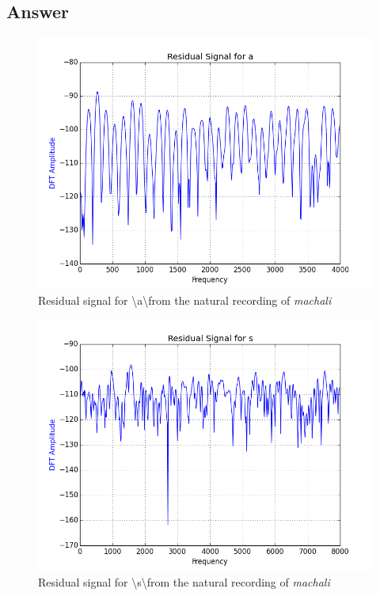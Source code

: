 \documentclass[a4paper]{article}
\begin{document}
\subsection{Answer}


\textbf{}

\begin{figure}[h!]
    \includegraphics[width=\linewidth]{./images/res_signal_a.png}
    \caption{Residual signal  for \textbackslash a\textbackslash from the natural recording of \textit{machali}}
    \label{fig:1}
\end{figure}


\begin{figure}[h!]
    \includegraphics[width=\linewidth]{./images/res_sig_s.png}
    \caption{Residual signal for \textbackslash s\textbackslash from the natural recording of \textit{machali}}
    \label{fig:1}
\end{figure}
\end{document}
